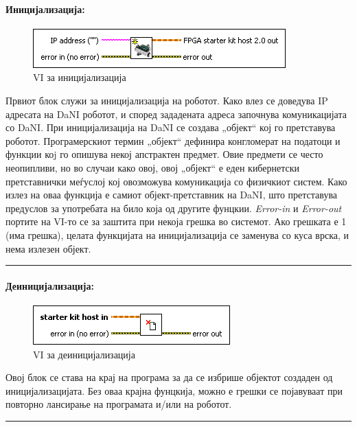 \documentclass[11pt]{article}
\begin{document}
		\paragraph{Иницијализација:\\}
			\begin{figure}[h]
				\includegraphics[width=0.55\linewidth]{./images/init.png}
				\raggedright
				\caption{VI за иницијализација}
				\label{fig:init.png}
				\end{figure}
		  Првиот блок служи за иницијализација на роботот. Како влез се доведува IP адресата на DaNI роботот, и според зададената адреса започнува комуникацијата со DaNI. При иницијализација на DaNI се создава „објект“ кој го претставува роботот. Програмерскиот термин „објект“ дефинира конгломерат на податоци и функции коj го опишува некој апстрактен предмет. Овие предмети се често неопипливи, но во случаи како овој, овој „објект“ е еден кибернетски претставнички меѓуслој кој овозможува комуникација со физичкиот систем. Како излез на оваа функција е самиот објект-претставник на DaNI, што претставува предуслов за употребата на било која од другите фунцкии. \textit{Error-in} и \textit{Error-out} портите на VI-то се за заштита при некоја грешка во системот. Ако грешката е 1 (има грешка), целата функцијата на иницијализација се заменува со куса врска, и нема излезен објект.
      \\
      \textcolor[RGB]{150,150,150}{\rule{\linewidth}{1.6pt}}

    \paragraph{Деиницијализација:\\}
    	\begin{figure}[h]
        \includegraphics[width = 0.55\linewidth]{./images/deinit.png}
				\raggedright
				\caption{VI за деиницијализација}
				\label{fig:deinit.png}
				\end{figure}
      Овој блок се става на крај на програма за да се избрише објектот создаден од иницијализацијата. Без оваа крајна фунцкија, можно е грешки се појавуваат при повторно лансирање на програмата и/или на роботот.\\
      \textcolor[RGB]{150,150,150}{\rule{\linewidth}{1.6pt}}
\end{document}
